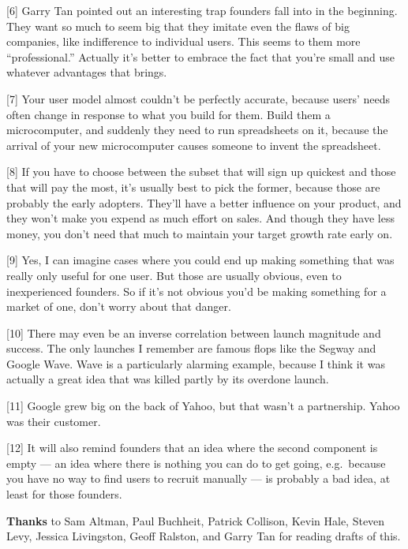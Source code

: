 {[}6{]} Garry Tan pointed out an interesting trap founders fall into in
the beginning. They want so much to seem big that they imitate even the
flaws of big companies, like indifference to individual users. This
seems to them more ``professional.'' Actually it's better to embrace the
fact that you're small and use whatever advantages that brings.

{[}7{]} Your user model almost couldn't be perfectly accurate, because
users' needs often change in response to what you build for them. Build
them a microcomputer, and suddenly they need to run spreadsheets on it,
because the arrival of your new microcomputer causes someone to invent
the spreadsheet.

{[}8{]} If you have to choose between the subset that will sign up
quickest and those that will pay the most, it's usually best to pick the
former, because those are probably the early adopters. They'll have a
better influence on your product, and they won't make you expend as much
effort on sales. And though they have less money, you don't need that
much to maintain your target growth rate early on.

{[}9{]} Yes, I can imagine cases where you could end up making something
that was really only useful for one user. But those are usually obvious,
even to inexperienced founders. So if it's not obvious you'd be making
something for a market of one, don't worry about that danger.

{[}10{]} There may even be an inverse correlation between launch
magnitude and success. The only launches I remember are famous flops
like the Segway and Google Wave. Wave is a particularly alarming
example, because I think it was actually a great idea that was killed
partly by its overdone launch.

{[}11{]} Google grew big on the back of Yahoo, but that wasn't a
partnership. Yahoo was their customer.

{[}12{]} It will also remind founders that an idea where the second
component is empty --- an idea where there is nothing you can do to get
going, e.g.~because you have no way to find users to recruit manually
--- is probably a bad idea, at least for those founders.

\textbf{Thanks} to Sam Altman, Paul Buchheit, Patrick Collison, Kevin
Hale, Steven Levy, Jessica Livingston, Geoff Ralston, and Garry Tan for
reading drafts of this.
